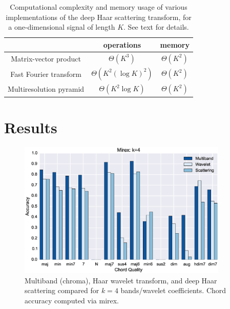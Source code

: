 \documentclass{article}
\begin{document}
\begin{table}
	\begin{center}
	\begin{tabular}{|c|cc|}
		\hline
		& operations & memory \\
		\hline
		Matrix-vector product & $\Theta(K^3)$ & $\Theta(K^2)$ \\
		Fast Fourier transform & $\Theta(K^2 (\log K)^2)$ & $\Theta(K^2)$ \\
		Multiresolution pyramid & $\Theta(K^2 \log K)$ & $\Theta(K^2)$ \\
		\hline		
	\end{tabular}
	\end{center}
	\caption{Computational complexity and memory usage of various implementations
	of the deep Haar scattering transform, for a one-dimensional signal
	of length $K$. See text for details.
	\label{table:scattering-complexities}}
\end{table}
	

\section{Results}\label{sec:results}

\begin{figure}
 \centerline{
 \includegraphics[width=10cm]{figs/mirex4.eps}}
 \caption{Multiband (chroma), Haar wavelet transform, and deep Haar scattering compared for $k=4$ bands/wavelet coefficients. Chord accuracy computed via mirex.}
 \label{fig:mirex4}
\end{figure}
\end{document}
